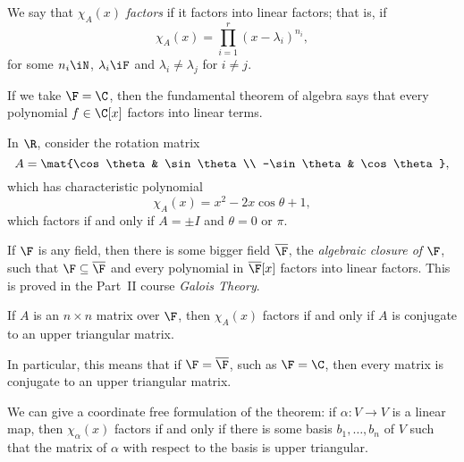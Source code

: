 \begin{definition}
	We say that $\chi_A(x)$ \emph{factors} if it factors into linear factors; that is, if
	\begin{equation*}
		\chi_A(x) = \displaystyle\prod_{i=1}^r \left( x-\lambda_i \right)^{n_i},
	\end{equation*}
	for some $n_i\iN$, $\lambda_i\iF$ and $\lambda_i\neq \lambda_j$ for $i\neq j$.
\end{definition}

\begin{examples}
	If we take $\F=\C$, then the fundamental theorem of algebra says that every polynomial $f\in\C[x]$ factors into linear terms.
	
	In $\R$, consider the rotation matrix
	\begin{equation*}
		A=\mat{\cos\theta & \sin\theta \\ -\sin\theta & \cos\theta},
	\end{equation*}
	which has characteristic polynomial
	\begin{equation*}
		\chi_A(x) = x^2-2x\cos\theta+1,
	\end{equation*}
	which factors if and only if $A=\pm I$ and $\theta=0$ or $\pi$.
\end{examples}

\begin{definition}
	If $\F$ is any field, then there is some bigger field $\overline{\F}$, the \emph{algebraic closure of $\F$}, such that $\F \subseteq \overline{\F}$ and every polynomial in $\overline{\F}[x]$ factors into linear factors. This is proved in the Part~II course \emph{Galois Theory}.
\end{definition}

\begin{theorem}
	If $A$ is an $n\times n$ matrix over $\F$, then	$\chi_A(x)$ factors if and only if $A$  is conjugate to an upper triangular matrix.
	
	In particular, this means that if $\F=\overline{\F}$, such as $\F=\C$, then every matrix is conjugate to an upper triangular matrix.
\end{theorem}

\vspace{3pt}

We can give a coordinate free formulation of the theorem: if $\alpha:V\to V$ is a linear map, then $\chi_\alpha(x)$ factors if and only if there is some basis $b_1,\ldots,b_n$ of $V$ such that the matrix of $\alpha$ with respect to the basis is upper triangular.

